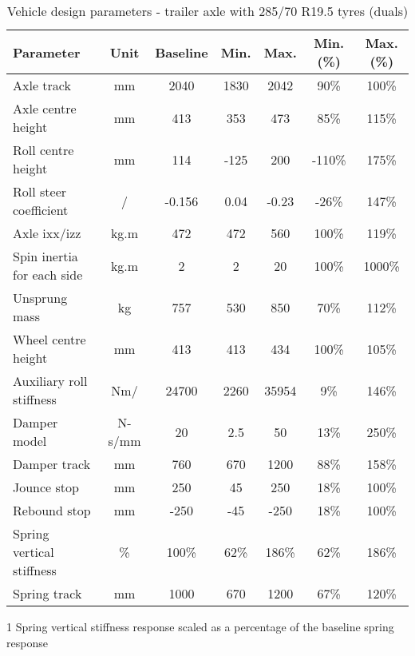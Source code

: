 \begin{table}[H]
	\centering\footnotesize
	\begin{threeparttable}

		\begin{tabulary}{\textwidth}{lcccccc}
			\toprule
			\textbf{Parameter} & \textbf{Unit} & \textbf{Baseline} & \textbf{Min.} & \textbf{Max.} & \textbf{Min. (\%)} & \textbf{Max. (\%)} \\

			\midrule
			Axle track & mm    & 2040  & 1830  & 2042  & 90\%  & 100\% \\
			Axle centre height & mm    & 413   & 353   & 473   & 85\%  & 115\% \\
			Roll centre height & mm    & 114   & -125  & 200   & -110\% & 175\% \\
			Roll steer coefficient & \degree{}/\degree{} & -0.156 & 0.04  & -0.23 & -26\% & 147\% \\
			Axle \gls{ixx}/\gls{izz}  & kg.m\sstw{} & 472   & 472   & 560   & 100\% & 119\% \\
			Spin inertia for each side & kg.m\sstw{} & 2     & 2     & 20    & 100\% & 1000\% \\
			Unsprung mass  & kg    & 757   & 530   & 850   & 70\%  & 112\% \\
			Wheel centre height & mm    & 413   & 413   & 434   & 100\% & 105\% \\
			Auxiliary roll stiffness  & Nm/\degree{} & 24700 & 2260  & 35954 & 9\%   & 146\% \\
			Damper model & N-s/mm & 20    & 2.5   & 50    & 13\%  & 250\% \\
			Damper track & mm    & 760   & 670   & 1200  & 88\%  & 158\% \\
			Jounce stop & mm    & 250   & 45    & 250   & 18\%  & 100\% \\
			Rebound stop & mm    & -250  & -45   & -250  & 18\%  & 100\% \\
			Spring vertical stiffness & \%  & 100\% & 62\%  & 186\% & 62\%  & 186\% \\
			Spring track & mm    & 1000  & 670   & 1200  & 67\%  & 120\% \\

			\bottomrule
		\end{tabulary}

		\caption{Vehicle design parameters - trailer axle with 285/70 R19.5 tyres (duals)}
		\label{table:vdp-range-axle-trailer-285}

		\begin{tablenotes}
			\item[1] Spring vertical stiffness response scaled as a percentage of the baseline spring response
		\end{tablenotes}

	\end{threeparttable}
\end{table}
\newpage
